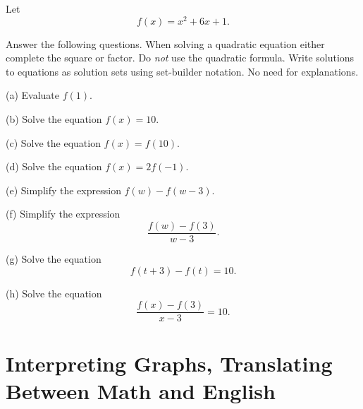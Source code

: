 \documentclass{ximera}
\begin{document}
\begin{question}  \label{Qersr4r}
Let
\[
     f(x) = x^2 + 6x + 1 .
\]

Answer the following questions. When solving a quadratic equation either complete the square or factor. Do \emph{not} use the quadratic formula. Write solutions to equations as solution sets using set-builder notation. No need for explanations. 

(a) Evaluate $f(1)$.

(b) Solve the equation $f(x)=10$.

(c) Solve the equation $f(x)=f(10)$.

(d) Solve the equation $f(x) = 2 f(-1)$.

(e) Simplify the expression $f(w) - f(w-3)$.

(f) Simplify the expression
\[
      \frac{f(w) - f(3)}{w-3} .
\]

(g) Solve the equation
\[
           f(t+3) - f(t) = 10 .
\]

(h) Solve the equation
\[
           \frac{f(x) - f(3)}{x-3} = 10.
\]
\end{question}



\section{Interpreting Graphs, Translating Between Math and English}
\end{document}
